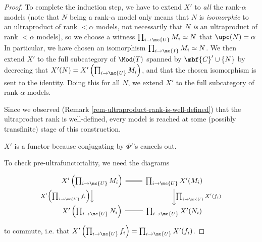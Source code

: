 \begin{proof}
    To complete the induction step, we have to extend $X'$ to \emph{all} the rank-$\alpha$ models (note that $N$ being a rank-$\alpha$ model only means that $N$ is \emph{isomorphic} to an ultraproduct of rank $<\alpha$ models, not necessarily that $N$ \emph{is} an ultraproduct of rank $<\alpha$ models), so we choose a witness $\prod_{i \to \mc{U}} M_i \simeq N$ that $\upc(N) = \alpha$ In particular, we have chosen an isomorphism $\prod_{i \to \mc{I}} M_i \simeq N$. We then extend $X'$ to the full subcategory of $\Mod(T)$ spanned by $\mbf{C}' \cup \{N\}$ by decreeing that $X'(N) = X'\left(\prod_{i \to \mc{U}} M_i\right)$, and that the chosen isomorphism is sent to the identity. Doing this for all $N$, we extend $X'$ to the full subcategory of rank-$\alpha$-models.
    
    Since we observed (Remark \ref{rem-ultraproduct-rank-is-well-defined}) that the ultraproduct rank is well-defined, every model is reached at some (possibly transfinite) stage of this construction.

    $X'$ is a functor because conjugating by $\Phi'$'s cancels out.

    To check pre-ultrafunctoriality, we need the diagrams
    $$
    \begin{tikzcd}[ampersand replacement = \&]
X'\left(\prod_{i \to \mc{U}} M_i \right) \arrow[equals]{r} \arrow[swap]{d}{X' \left( \prod_{i \to \mc{U}} f_i \right)}  \& \prod_{i \to \mc{U}} X'(M_i) \arrow{d}{\prod_{i \to \mc{U}} X'(f_i)} \\
X'\left(\prod_{i \to \mc{U}} N_i\right) \arrow[equals]{r}      \&\prod_{i \to \mc{U}} X'(N_i)
      \end{tikzcd}
    $$
    to commute, i.e. that $X'\left(\prod_{i \to \mc{U}} f_i \right) = \prod_{i \to \mc{U}} X'(f_i)$.


\end{proof}
